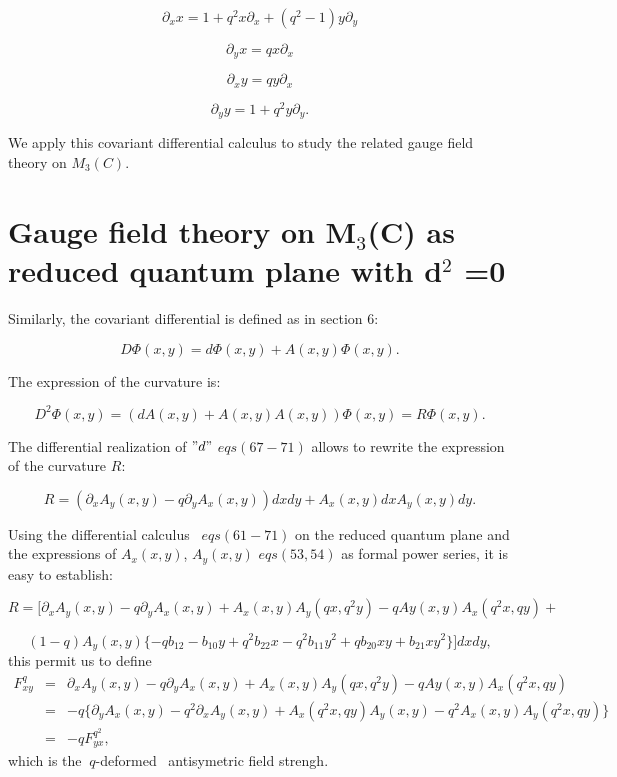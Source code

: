 \documentclass[a4paper,12pt,thmsa]{article}
\begin{document}
\begin{equation}
\partial _xx=1+q^2x\partial _x+(q^2-1)y\partial _y
\end{equation}

\begin{equation}
\partial _yx=qx\partial _x
\end{equation}

\begin{equation}
\partial _xy=qy\partial _x
\end{equation}

\begin{equation}
\partial _{y}y=1+q^{2}y\partial _{y}.
\end{equation}

We apply this covariant differential calculus to study the related gauge
field theory on $M_3(C).$

\section{ Gauge field theory on M$_3$(C) as reduced quantum plane with d$^2$%
=0}

Similarly, the covariant differential is defined as in section $6$:

\begin{equation}
D\Phi (x,y)=d\Phi (x,y)+A(x,y)\Phi (x,y).
\end{equation}

The expression of the curvature is:

\begin{equation}
D^{2}\Phi (x,y)=(dA(x,y)+A(x,y)A(x,y))\Phi (x,y)=R\Phi (x,y).
\end{equation}

The differential realization of $"d"$ $eqs(67-71)$ allows to rewrite the
expression of the curvature $R$:

\begin{equation}
R=(\partial _xA_y(x,y)-q\partial _yA_x(x,y))dxdy+A_x(x,y)dxA_y(x,y)dy.
\end{equation}

Using the differential calculus ~$eqs(61-71)$ on the reduced quantum plane
and the expressions of $A_x(x,y)$, $A_y(x,y)$ $eqs(53,54)$ as formal power
series, it is easy to establish:

\[
R=[\partial _xA_y(x,y)-q\partial
_yA_x(x,y)+A_x(x,y)A_y(qx,q^2y)-qAy(x,y)A_x(q^2x,qy)+
\]

\begin{equation}
(1-q)A_y(x,y)\{-qb_{12}-b_{10}y+q^2b_{22}x-q^2b_{11}y^2+qb_{20}xy+b_{21}xy^2%
\}]dxdy,
\end{equation}
this permit us to define
\begin{eqnarray}
F_{xy}^q &=&\partial _xA_y(x,y)-q\partial _yA_x(x,y)+%
A_x(x,y)A_y(qx,q^2y)-qAy(x,y)A_x(q^2x,qy)  \nonumber \\
&=&-q\{\partial _yA_x(x,y)-q^2\partial _xA_y(x,y)+%
A_x(q^2x,qy)A_y(x,y)-q^2A_x(x,y)A_y(q^2x,qy)\}  \nonumber \\
&=&-qF_{yx}^{q^2},
\end{eqnarray}
which is the $\ q$-deformed \ antisymetric field strengh.
\end{document}
